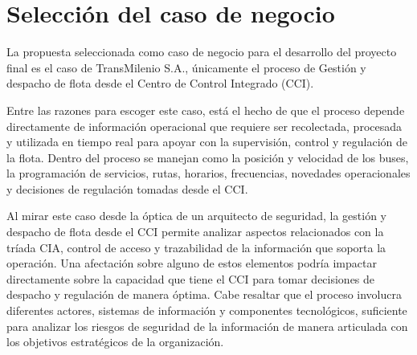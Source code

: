 \section{Selección del caso de negocio}

La propuesta seleccionada como caso de negocio para el desarrollo del proyecto final es el caso de TransMilenio S.A., únicamente el proceso de Gestión y despacho de flota desde el Centro de Control Integrado (CCI).

Entre las razones para escoger este caso, está el hecho de que el proceso depende directamente de información operacional que requiere ser recolectada, procesada y utilizada en tiempo real para apoyar con la supervisión, control y regulación de la flota. Dentro del proceso se manejan como la posición y velocidad de los buses, la programación de servicios, rutas, horarios, frecuencias, novedades operacionales y decisiones de regulación tomadas desde el CCI.

Al mirar este caso desde la óptica de un arquitecto de seguridad, la gestión y despacho de flota desde el CCI permite analizar aspectos relacionados con la tríada CIA, control de acceso y trazabilidad de la información que soporta la operación. Una afectación sobre alguno de estos elementos podría impactar directamente sobre la capacidad que tiene el CCI para tomar decisiones de despacho y regulación de manera óptima. Cabe resaltar que el proceso involucra diferentes actores, sistemas de información y componentes tecnológicos, suficiente para analizar los riesgos de seguridad de la información de manera articulada con los objetivos estratégicos de la organización.
